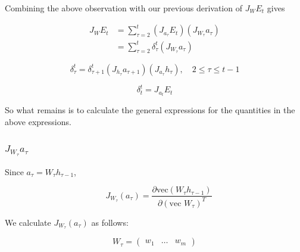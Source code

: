 Combining the above observation with our previous derivation of $J_W E_t$ gives

\begin{align*}
  J_W E_t & = \sum_{\tau=2}^{t} (J_{a_\tau} E_t)(J_{W_\tau} a_\tau) \\
  & = \sum_{\tau=2}^{t} \delta_{\tau}^t (J_{W_\tau} a_\tau)
\end{align*}

\begin{equation*}
\delta_{\tau}^t = \delta_{\tau + 1}^t (J_{h_\tau} a_{\tau + 1})(J_{a_\tau} h_\tau), \quad 2 \leq \tau \leq t -1
\end{equation*}

\begin{equation*}
\delta_{t}^t = J_{a_t} E_t
\end{equation*}

So what remains is to calculate the general expressions for the quantities in the above expressions.

\subsubsection{$J_{W_\tau} a_\tau$}

Since $a_{\tau} = W_\tau h_{\tau - 1}$,

\begin{equation*}
\quad J_{W_\tau}(a_\tau) = \frac{\partial \mbox{vec}(W_\tau h_{\tau - 1})}{\partial (\mbox{vec } W_\tau)^T}
\end{equation*}

We calculate $J_{W_\tau}(a_\tau)$ as follows:

\begin{equation*}
W_\tau = \begin{pmatrix} w_1 & \ldots & w_m \end{pmatrix}
\end{equation*}

